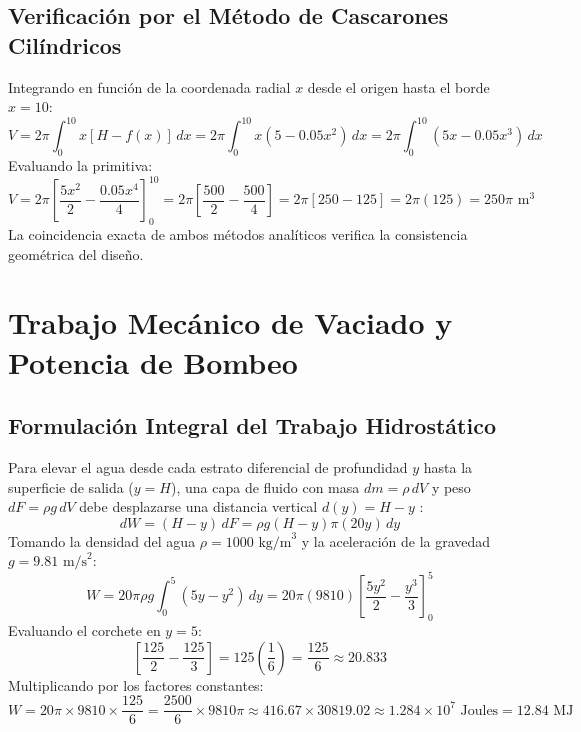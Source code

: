 \subsection{Verificación por el Método de Cascarones Cilíndricos}
Integrando en función de la coordenada radial $x$ desde el origen hasta el borde $x=10$:
\begin{equation}
    V = 2\pi \int_{0}^{10} x [H - f(x)]\,dx = 2\pi \int_{0}^{10} x (5 - 0.05 x^2)\,dx = 2\pi \int_{0}^{10} (5x - 0.05 x^3)\,dx
\end{equation}
Evaluando la primitiva:
\begin{equation}
    V = 2\pi \left[ \frac{5x^2}{2} - \frac{0.05 x^4}{4} \right]_{0}^{10} = 2\pi \left[ \frac{500}{2} - \frac{500}{4} \right] = 2\pi [250 - 125] = 2\pi(125) = 250\pi\text{ m}^3
\end{equation}
La coincidencia exacta de ambos métodos analíticos verifica la consistencia geométrica del diseño.

\section{Trabajo Mecánico de Vaciado y Potencia de Bombeo}
\subsection{Formulación Integral del Trabajo Hidrostático}
Para elevar el agua desde cada estrato diferencial de profundidad $y$ hasta la superficie de salida ($y=H$), una capa de fluido con masa $dm = \rho \, dV$ y peso $dF = \rho g \, dV$ debe desplazarse una distancia vertical $d(y) = H - y$ \parencite{stewart2016}:
\begin{equation}
    dW = (H - y)\,dF = \rho g (H - y) \pi (20y)\,dy
\end{equation}
Tomando la densidad del agua $\rho = 1000\text{ kg/m}^3$ y la aceleración de la gravedad $g = 9.81\text{ m/s}^2$:
\begin{equation}
    W = 20\pi \rho g \int_{0}^{5} (5y - y^2)\,dy = 20\pi (9810) \left[ \frac{5y^2}{2} - \frac{y^3}{3} \right]_{0}^{5}
\end{equation}
Evaluando el corchete en $y=5$:
\begin{equation}
    \left[ \frac{125}{2} - \frac{125}{3} \right] = 125 \left( \frac{1}{6} \right) = \frac{125}{6} \approx 20.833
\end{equation}
Multiplicando por los factores constantes:
\begin{equation}
    W = 20\pi \times 9810 \times \frac{125}{6} = \frac{2500}{6} \times 9810 \pi \approx 416.67 \times 30819.02 \approx 1.284 \times 10^7\text{ Joules} = 12.84\text{ MJ}
\end{equation}

